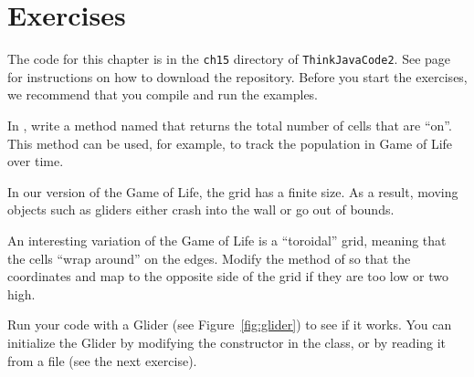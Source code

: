\section{Exercises}

The code for this chapter is in the {\tt ch15} directory of {\tt ThinkJavaCode2}.
See page~\pageref{code} for instructions on how to download the repository.
Before you start the exercises, we recommend that you compile and run the examples.


\begin{exercise}
In , write a method named  that returns the total number of cells that are ``on''.
This method can be used, for example, to track the population in Game of Life over time.
\end{exercise}


\begin{exercise}
In our version of the Game of Life, the grid has a finite size.
As a result, moving objects such as gliders either crash into the wall or go out of bounds.

An interesting variation of the Game of Life is a ``toroidal'' grid, meaning that the cells ``wrap around'' on the edges.
Modify the  method of  so that the coordinates  and  map to the opposite side of the grid if they are too low or two high.

Run your code with a Glider (see Figure~\ref{fig:glider}) to see if it works.
You can initialize the Glider by modifying the constructor in the  class, or by reading it from a file (see the next exercise).
\end{exercise}





